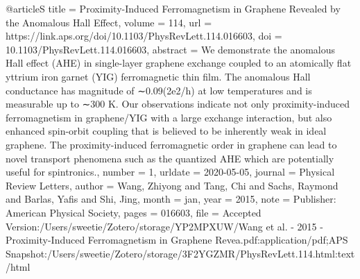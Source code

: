 

@article{S
	title = {Proximity-{Induced} {Ferromagnetism} in {Graphene} {Revealed} by the {Anomalous} {Hall} {Effect}},
	volume = {114},
	url = {https://link.aps.org/doi/10.1103/PhysRevLett.114.016603},
	doi = {10.1103/PhysRevLett.114.016603},
	abstract = {We demonstrate the anomalous Hall effect (AHE) in single-layer graphene exchange coupled to an atomically flat yttrium iron garnet (YIG) ferromagnetic thin film. The anomalous Hall conductance has magnitude of ∼0.09(2e2/h) at low temperatures and is measurable up to ∼300 K. Our observations indicate not only proximity-induced ferromagnetism in graphene/YIG with a large exchange interaction, but also enhanced spin-orbit coupling that is believed to be inherently weak in ideal graphene. The proximity-induced ferromagnetic order in graphene can lead to novel transport phenomena such as the quantized AHE which are potentially useful for spintronics.},
	number = {1},
	urldate = {2020-05-05},
	journal = {Physical Review Letters},
	author = {Wang, Zhiyong and Tang, Chi and Sachs, Raymond and Barlas, Yafis and Shi, Jing},
	month = jan,
	year = {2015},
	note = {Publisher: American Physical Society},
	pages = {016603},
	file = {Accepted Version:/Users/sweetie/Zotero/storage/YP2MPXUW/Wang et al. - 2015 - Proximity-Induced Ferromagnetism in Graphene Revea.pdf:application/pdf;APS Snapshot:/Users/sweetie/Zotero/storage/3F2YGZMR/PhysRevLett.114.html:text/html}
}

